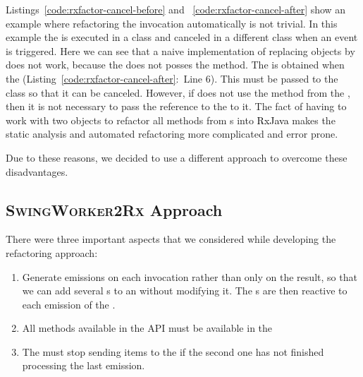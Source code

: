 \documentclass[type=bsc,accentcolor=tud9c]{tudthesis}
\newcommand{\framework}[1]{\textcolor{black}{#1}}
\newcommand{\toolextension}{\textsc{SwingWorker2Rx}}
\begin{document}


Listings~\ref{code:rxfactor-cancel-before} and ~\ref{code:rxfactor-cancel-after} show an example where refactoring the  invocation automatically is not trivial. In this example the  is executed in a class and canceled in a different class when an event is triggered. Here we can see that a naive implementation of replacing  objects by  does not work, because the  does not posses the  method. The  is obtained when the  (Listing~\ref{code:rxfactor-cancel-after}:~Line 6). This  must be passed to the class  so that it can be canceled. However, if  does not use the  method from the , then it is not necessary to pass the reference to the  to it. The fact of having to work with two objects to refactor all methods from s into \framework{RxJava} makes the static analysis and automated refactoring more complicated and error prone.



Due to these reasons, we decided to use a different approach to overcome these disadvantages.
\newpage

\subsection{\toolextension{} Approach}
\label{sec:2rx-approach}
There were three important aspects that we considered while developing the refactoring approach:
\begin{enumerate}
	\item Generate emissions on each  invocation rather than only on the result, so that we can add several s to an  without modifying it. The s are then reactive to each emission of the .
	\item All methods available in the  API must be available in the 
	\item The  must stop sending items to the  if the second one has not finished processing the last emission.
\end{enumerate}
\end{document}
